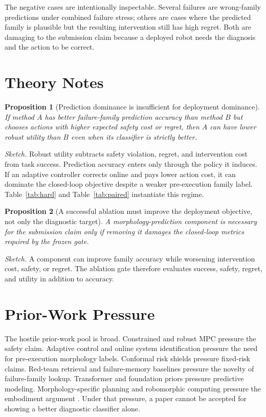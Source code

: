 \documentclass{article}
\newtheorem{proposition}{Proposition}
\begin{document}
The negative cases are intentionally inspectable. Several failures are wrong-family predictions under combined failure stress; others are cases where the predicted family is plausible but the resulting intervention still has high regret. Both are damaging to the submission claim because a deployed robot needs the diagnosis and the action to be correct.

\section{Theory Notes}
\begin{proposition}[Prediction dominance is insufficient for deployment dominance]
If method $A$ has better failure-family prediction accuracy than method $B$ but chooses actions with higher expected safety cost or regret, then $A$ can have lower robust utility than $B$ even when its classifier is strictly better.
\end{proposition}

\noindent\textit{Sketch.} Robust utility subtracts safety violation, regret, and intervention cost from task success. Prediction accuracy enters only through the policy it induces. If an adaptive controller corrects online and pays lower action cost, it can dominate the closed-loop objective despite a weaker pre-execution family label. Table~\ref{tab:hard} and Table~\ref{tab:paired} instantiate this regime.

\begin{proposition}[A successful ablation must improve the deployment objective, not only the diagnostic target]
A morphology-prediction component is necessary for the submission claim only if removing it damages the closed-loop metrics required by the frozen gate.
\end{proposition}

\noindent\textit{Sketch.} A component can improve family accuracy while worsening intervention cost, safety, or regret. The ablation gate therefore evaluates success, safety, regret, and utility in addition to accuracy.

\section{Prior-Work Pressure}
The hostile prior-work pool is broad. Constrained and robust MPC pressure the safety claim. Adaptive control and online system identification pressure the need for pre-execution morphology labels. Conformal risk shields pressure fixed-risk claims. Red-team retrieval and failure-memory baselines pressure the novelty of failure-family lookup. Transformer and foundation priors pressure predictive modeling. Morphology-specific planning and robomorphic computing pressure the embodiment argument \citep{r103390app11052383,r1053297182933282024146,r101101154757,r101142s2705078521500168,r10111511798071,r1020944preprints2021090099v1,r103390app152312659,r101007bf00294728,r101002oca2569,r101186s4306702300108y,r101007s00170021076823,r1046338ijetae112104,r103390app10051635,r101111sifp12085}. Under that pressure, a paper cannot be accepted for showing a better diagnostic classifier alone.
\end{document}
